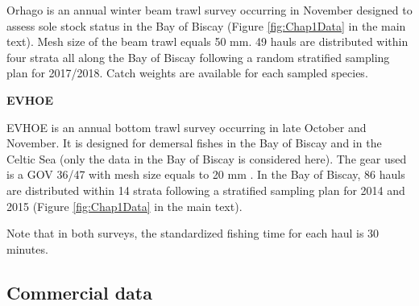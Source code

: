 Orhago is an annual winter beam trawl survey occurring in November designed to assess sole stock status in the Bay of Biscay (Figure \ref{fig:Chap1Data} in the main text). Mesh size of the beam trawl equals 50 mm. 49 hauls are distributed within four strata all along the Bay of Biscay following a random stratified sampling plan for 2017/2018. Catch weights are available for each sampled species. 

\vspace{\baselineskip}

\textbf{EVHOE}

EVHOE is an annual bottom trawl survey occurring in late October and November. It is designed for demersal fishes in the Bay of Biscay and in the Celtic Sea (only the data in the Bay of Biscay is considered here). The gear used is a GOV 36/47 with mesh size equals to 20 mm \parencite{ices-manual-2015}. In the Bay of Biscay, 86 hauls are distributed within 14 strata following a stratified sampling plan for 2014 and 2015 (Figure \ref{fig:Chap1Data}
in the main text).

Note that in both surveys, the standardized fishing time for each haul is 30 minutes.

\clearpage

\subsection{Commercial data}\label{appendix:ComData}

